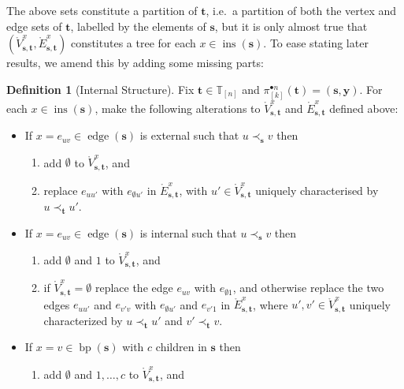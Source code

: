\documentclass[a4paper, final]{amsart}
\theoremstyle{plain}
\theoremstyle{definition}
\newtheorem{defi}[thm]{Definition}
\newcommand{\tree}[1][t]{\boldsymbol{#1}}
\newcommand{\T}{\mathbb{T}}
\DeclareMathOperator{\edge}{edge}
\DeclareMathOperator{\insertable}{ins}
\DeclareMathOperator{\branchpoints}{bp}
\newcommand{\insertablef}[1][\tree]{\insertable({\tree[#1]})}
\begin{document}
The above sets constitute a partition of $\tree$, i.e.\ a partition of both the vertex and edge sets of $\tree$, labelled by the elements of $\tree[s]$, but it is only almost true that $(\mathring{V}_{\tree[s], \tree}^x, \mathring{E}_{\tree[s], \tree}^x)$ constitutes a tree for each $x \in \insertablef[s]$.
  To ease stating later results, we amend this by adding some missing parts:
  \begin{defi}[Internal Structure]
    Fix $\tree \in \T_{[n]}$ and {$\pi_{[k]}^{\bullet n} (\tree) = (\tree[s], \mathbf{y})$}.
    For each $x \in \insertablef[s]$, make the following alterations to $\mathring{V}_{\tree[s], \tree}^x$ and $\mathring{E}_{\tree[s], \tree}^x$ defined above:
      \begin{itemize}
        \item If $x = e_{uv} \in \edge(\tree[s])$ is external such that $u \prec_{\tree[s]} v$ then 
          \begin{enumerate}
            \item add $\emptyset$ to $\mathring{V}_{\tree[s], \tree}^x$, and
            \item replace $e_{uu'}$ with $e_{\emptyset u'}$ in $\mathring{E}_{\tree[s], \tree}^x$, with $u' \in \mathring{V}_{\tree[s], \tree}^x$ uniquely characterised by $u \prec_{\tree} u'$.
          \end{enumerate}
        \item If $x = e_{uv} \in \edge(\tree[s])$ is internal such that $u \prec_{\tree[s]} v$ then
          \begin{enumerate}
            \item add $\emptyset$ and $1$ to $\mathring{V}_{\tree[s], \tree}^x$, and
            \item if $\mathring{V}_{\tree[s], \tree}^x = \emptyset$ replace the edge $e_{uv}$ with $e_{\emptyset 1}$, and otherwise replace the two edges $e_{uu'}$ and $e_{v'v}$ with $e_{\emptyset u'}$ and $e_{v' 1}$ in $\mathring{E}_{\tree[s], \tree}^x$, where $u', v' \in \mathring{V}_{\tree[s], \tree}^x$ uniquely characterized by $u \prec_{\tree} u'$ and $v' \prec_{\tree} v$.
          \end{enumerate}
        \item If $x = v \in \branchpoints (\tree[s])$ with $c$ children in $\tree[s]$ then
          \begin{enumerate}
            \item add $\emptyset$ and $1, \ldots, c$ to $\mathring{V}_{\tree[s], \tree}^x$, and

\end{enumerate}
\end{itemize}
\end{defi}
\end{document}
